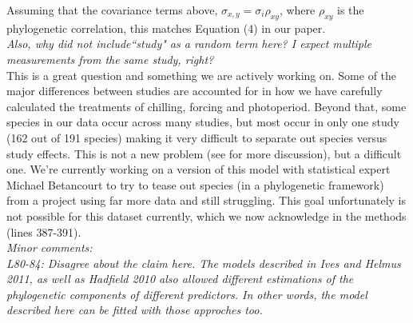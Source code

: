 \documentclass[11pt]{article}
\begin{document}
Assuming that the covariance terms above, $\sigma_{x,y}=\sigma_i \rho_{xy}$, where $\rho_{xy}$ is the phylogenetic correlation, this matches Equation (4) in our paper.\\

\emph{Also, why did not include``study" as a random term here? I expect multiple measurements from the same study, right?}\\

This is a great question and something we are actively working on. Some of the major differences between studies are accounted for in how we have carefully calculated the treatments of chilling, forcing and photoperiod. Beyond that, some species in our data occur across many studies, but most occur in only one study (162 out of 191 species) making it very difficult to separate out species versus study effects. This is not a new problem (see \cite{kharouba2018} for more discussion), but a difficult one. We're currently working on a version of this model with statistical expert Michael Betancourt to try to tease out species (in a phylogenetic framework) from a project using far more data and still struggling. This goal unfortunately is not possible for this dataset currently, which we now acknowledge in the methods (lines 387-391). \\



\emph{Minor comments:}\\
\emph{L80-84: Disagree about the claim here. The models described in Ives and Helmus 2011, as well as Hadfield 2010 also allowed different estimations of the phylogenetic components of different predictors. In other words, the model described here can be fitted with those approches too.}\\
\end{document}
